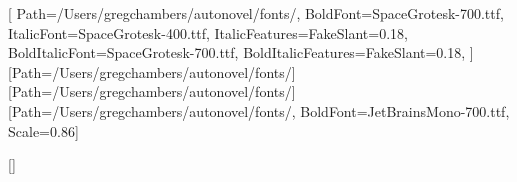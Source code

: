 \usepackage{fontspec}
\usepackage{xcolor}
\usepackage[margin=0.9in,top=0.85in,bottom=0.95in]{geometry}
\usepackage{titlesec}
\usepackage{colortbl}
\usepackage{array}
\usepackage{fancyhdr}
\usepackage{microtype}


\pagecolor{void}
\color{paper}

\def\fontsdir{/Users/gregchambers/autonovel/fonts/}
\setmainfont{SpaceGrotesk-400.ttf}[
  Path=\fontsdir,
  BoldFont=SpaceGrotesk-700.ttf,
  ItalicFont=SpaceGrotesk-400.ttf, ItalicFeatures={FakeSlant=0.18},
  BoldItalicFont=SpaceGrotesk-700.ttf, BoldItalicFeatures={FakeSlant=0.18},
]
\newfontfamily{}[Path=\fontsdir]
\newfontfamily{}[Path=\fontsdir]
\setmonofont{JetBrainsMono-400.ttf}[Path=\fontsdir, BoldFont=JetBrainsMono-700.ttf, Scale=0.86]

\setlength{\parindent}{0pt}
\setlength{\parskip}{6pt}
\linespread{1.08}

\everymath{\color{cyan}}
\everydisplay{\color{cyan}}

\titleformat{\section}{\displaysemi\large\color{pink}}{}{0pt}{\MakeUppercase}
  [{\color{pink!45}\titlerule[1pt]}]
\titlespacing*{\section}{0pt}{16pt}{8pt}
\titleformat{\subsection}{\displaysemi\normalsize\color{amber}}{}{0pt}{}
\titlespacing*{\subsection}{0pt}{12pt}{4pt}
\titleformat{\subsubsection}{\bfseries\color{cyan}}{}{0pt}{}
\titlespacing*{\subsubsection}{0pt}{10pt}{2pt}

